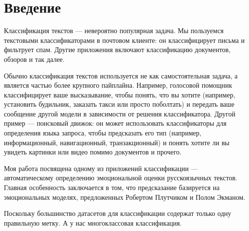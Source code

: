 \chapter*{Введение}

\par
Классификация текстов --- невероятно популярная задача. Мы пользуемся текстовыми классификаторами в почтовом клиенте: он классифицирует письма и фильтрует спам. Другие приложения включают классификацию документов, обзоров и так далее.

\bigskip\par
Обычно классификация текстов используется не как самостоятельная задача, а является частью более крупного пайплайна. Например, голосовой помощник классифицирует ваше высказывание, чтобы понять, что вы хотите (например, установить будильник, заказать такси или просто поболтать) и передать ваше сообщение другой модели в зависимости от решения классификатора.  Другой пример --- поисковый движок: он может использовать классификаторы для определения языка запроса, чтобы предсказать его тип (например, информационный, навигационный, транзакционный) и понять хотите ли вы увидеть картинки или видео помимо документов и прочего.

\bigskip\par
Моя работа посвящена одному из приложений классификации --- автоматическому определению эмоциональной оценки русскоязычных текстов. Главная особенность  заключается в том, что предсказание базируется на эмоциональных моделях, предложенных Робертом Плутчиком и Полом Экманом.


\bigskip\par
Поскольку большинство датасетов для классификации содержат только одну правильную метку. А у нас многоклассовая классификация.
